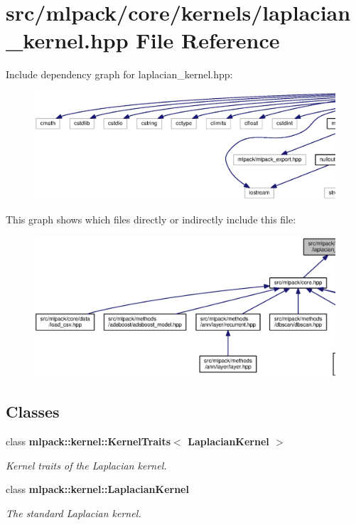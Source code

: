 \section{src/mlpack/core/kernels/laplacian\+\_\+kernel.hpp File Reference}
\label{laplacian__kernel_8hpp}
Include dependency graph for laplacian\+\_\+kernel.\+hpp\+:
\nopagebreak
\begin{figure}[H]
\begin{center}
\leavevmode
\includegraphics[width=350pt]{laplacian__kernel_8hpp__incl}
\end{center}
\end{figure}
This graph shows which files directly or indirectly include this file\+:
\nopagebreak
\begin{figure}[H]
\begin{center}
\leavevmode
\includegraphics[width=350pt]{laplacian__kernel_8hpp__dep__incl}
\end{center}
\end{figure}
\subsection*{Classes}
\begin{DoxyCompactItemize}
\item 
class {\bf mlpack\+::kernel\+::\+Kernel\+Traits$<$ Laplacian\+Kernel $>$}
\begin{DoxyCompactList}\small\item\em Kernel traits of the Laplacian kernel. \end{DoxyCompactList}\item 
class {\bf mlpack\+::kernel\+::\+Laplacian\+Kernel}
\begin{DoxyCompactList}\small\item\em The standard Laplacian kernel. \end{DoxyCompactList}\end{DoxyCompactItemize}
